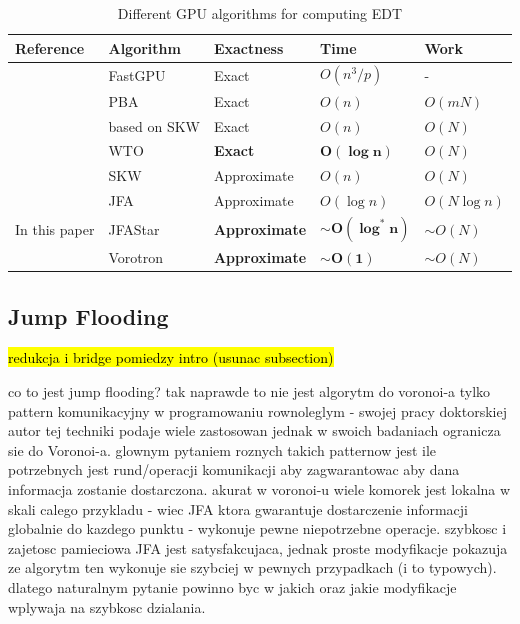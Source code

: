 \documentclass[format=acmsmall,screen,review,authordraft,nonacm]{acmart}
\newcommand{\ourjfasingle}{JFAStar}
\newcommand{\ourjfa}{Vorotron} %
\begin{document}
\begin{table}[H] \centering
\begin{tabular}{@{}lllll@{}}
\toprule
Reference                & Algorithm    & Exactness   & Time         & Work         \\ \midrule
\citep{de2017fast}       & FastGPU      & Exact       & $O(n^3/p)$   & -            \\
\citep{cao2010parallel}  & PBA          & Exact       & $O(n)$       & $O(mN)$      \\
\citep{honda2017simple}  & based on SKW & Exact       & $O(n)$       & $O(N)$       \\
\citep{manduhu2019work}  & WTO          & \cellcolor{blue!25}\textbf{Exact}&
	\cellcolor{blue!25}$\mathbf{O(\log n)}$  & $O(N)$       \\
\citep{schneider2009gpu} & SKW          & Approximate & $O(n)$       & $O(N)$       \\
\citep{rong2006jump}     & JFA          & Approximate & $O(\log n)$  & $O(N\log n)$ \\ \bottomrule
In this paper            & \ourjfasingle&
	\cellcolor{blue!25}\textbf{Approximate} &
	\cellcolor{blue!25}$\sim$$\mathbf{O(\log^{\ast} n)}$ & $\sim$$O(N)$ \\
                         & \ourjfa      &
	\cellcolor{blue!25}\textbf{Approximate} &
	\cellcolor{blue!25}$\sim$$\mathbf{O(1)}$ & $\sim$$O(N)$ \\
\bottomrule
\end{tabular}
\vspace{1em}
\caption{Different GPU algorithms for computing EDT}
\end{table}

\subsection{Jump Flooding} %

\hl{redukcja i bridge pomiedzy intro (usunac subsection)}

co to jest jump flooding? tak naprawde to nie jest algorytm do voronoi-a tylko
pattern komunikacyjny w programowaniu rownoleglym - swojej pracy doktorskiej
autor tej techniki podaje wiele zastosowan jednak w swoich badaniach ogranicza
sie do Voronoi-a. glownym pytaniem roznych takich patternow jest ile potrzebnych
jest rund/operacji komunikacji aby zagwarantowac aby dana informacja zostanie
dostarczona. akurat w voronoi-u wiele komorek jest lokalna w skali calego
przykladu - wiec JFA ktora gwarantuje dostarczenie informacji globalnie do
kazdego punktu - wykonuje pewne niepotrzebne operacje.  szybkosc i zajetosc
pamieciowa JFA jest satysfakcujaca, jednak proste modyfikacje pokazuja ze
algorytm ten wykonuje sie szybciej w pewnych przypadkach (i to typowych).
dlatego naturalnym pytanie powinno byc w jakich oraz jakie modyfikacje wplywaja
na szybkosc dzialania.
\end{document}
